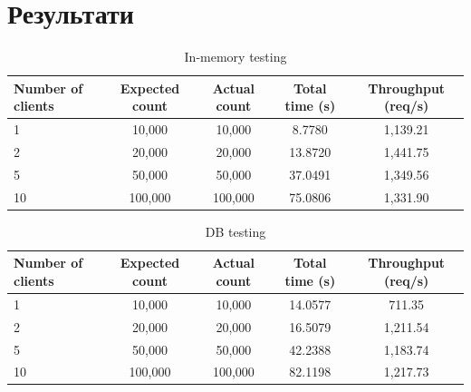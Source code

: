 \documentclass[12pt,a4paper]{article}
\begin{document}
\section{Результати}
\begin{table}[h!]
  \centering
  \caption{In-memory testing}
  \label{tab:in_memory_testing}
  \begin{tabular}{lcccc}
    \toprule
    \textbf{Number of clients} & \textbf{Expected count} & \textbf{Actual count} & \textbf{Total time (s)} & \textbf{Throughput (req/s)} \\
    \midrule
    1 & 10,000 & 10,000 & 8.7780 & 1,139.21 \\
    2 & 20,000 & 20,000 & 13.8720 & 1,441.75 \\
    5 & 50,000 & 50,000 & 37.0491 & 1,349.56 \\
    10 & 100,000 & 100,000 & 75.0806 & 1,331.90 \\
    \bottomrule
  \end{tabular}
\end{table}
\begin{table}[h!]
  \centering
  \caption{DB testing}
  \label{tab:db_testing}
  \begin{tabular}{lcccc}
    \toprule
    \textbf{Number of clients} & \textbf{Expected count} & \textbf{Actual count} & \textbf{Total time (s)} & \textbf{Throughput (req/s)} \\
    \midrule
    1 & 10,000 & 10,000 & 14.0577 & 711.35 \\
    2 & 20,000 & 20,000 & 16.5079 & 1,211.54 \\
    5 & 50,000 & 50,000 & 42.2388 & 1,183.74 \\
    10 & 100,000 & 100,000 & 82.1198 & 1,217.73 \\
    \bottomrule
  \end{tabular}
\end{table}

\newpage
\end{document}
